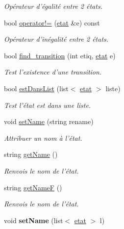 \begin{DoxyCompactItemize}
\begin{DoxyCompactList}\small\item\em Opérateur d'égalité entre 2 états. \end{DoxyCompactList}\item 
bool \hyperlink{classetat_a5841b1b0055485e6d3edc6d9b1c500cb}{operator!=} (\hyperlink{classetat}{etat} \&e) const 
\begin{DoxyCompactList}\small\item\em Opérateur d'inégalité entre 2 états. \end{DoxyCompactList}\item 
bool \hyperlink{classetat_acab203fc095b3974136c4f73895df9a6}{find\-\_\-transition} (int etiq, \hyperlink{classetat}{etat} e)
\begin{DoxyCompactList}\small\item\em Test l'existence d'une transition. \end{DoxyCompactList}\item 
bool \hyperlink{classetat_a381028a7a37e890734c1cc4afe05bd55}{est\-Dans\-List} (list$<$ \hyperlink{classetat}{etat} $>$ liste)
\begin{DoxyCompactList}\small\item\em Test l'état est dans une liste. \end{DoxyCompactList}\item 
void \hyperlink{classetat_a935983bd0159129dbd0bbddb50e1dd8a}{set\-Name} (string rename)
\begin{DoxyCompactList}\small\item\em Attribuer un nom à l'état. \end{DoxyCompactList}\item 
string \hyperlink{classetat_a938d2165beabfb6de3ad16e2a15b05c5}{get\-Name} ()
\begin{DoxyCompactList}\small\item\em Renvois le nom de l'état. \end{DoxyCompactList}\item 
string \hyperlink{classetat_a37ee0f6502f471dd3566733f8a1bc8fe}{get\-Name\-F} ()
\begin{DoxyCompactList}\small\item\em Renvois le nom de l'état. \end{DoxyCompactList}\item 
\hypertarget{classetat_a87882f3b4b4e3bae6b7a22008241d836}{void {\bfseries set\-Name} (list$<$ \hyperlink{classetat}{etat} $>$ l)}\label{classetat_a87882f3b4b4e3bae6b7a22008241d836}

\end{DoxyCompactItemize}
